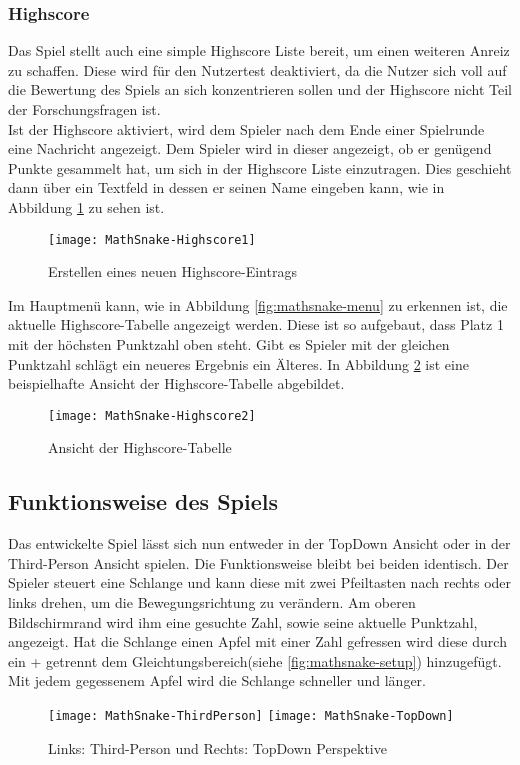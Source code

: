 \subsubsection{Highscore}
Das Spiel stellt auch eine simple Highscore Liste bereit, um einen weiteren Anreiz zu schaffen. Diese wird für den Nutzertest deaktiviert, da die Nutzer sich voll auf die Bewertung des Spiels an sich konzentrieren sollen und der Highscore nicht Teil der Forschungsfragen ist.\\
Ist der Highscore aktiviert, wird dem Spieler nach dem Ende einer Spielrunde eine Nachricht angezeigt. Dem Spieler wird in dieser angezeigt, ob er genügend Punkte gesammelt hat, um sich in der Highscore Liste einzutragen. Dies geschieht dann über ein Textfeld in dessen er seinen Name eingeben kann, wie in Abbildung \ref{fig:mathsnake-newHighscore} zu sehen ist.
\begin{figure}[htb]
	\centering
	\texttt{[image: MathSnake-Highscore1]}
	\caption{Erstellen eines neuen Highscore-Eintrags\label{fig:mathsnake-newHighscore}}
\end{figure}
Im Hauptmenü kann, wie in Abbildung \ref{fig:mathsnake-menu} zu erkennen ist, die aktuelle Highscore-Tabelle angezeigt werden. Diese ist so aufgebaut, dass Platz 1 mit der höchsten Punktzahl oben steht. Gibt es Spieler mit der gleichen Punktzahl schlägt ein neueres Ergebnis ein Älteres. In Abbildung \ref{fig:mathsnake-HighscoreTable} ist eine beispielhafte Ansicht der Highscore-Tabelle abgebildet.
\begin{figure}[htb]
	\centering
	\texttt{[image: MathSnake-Highscore2]}
	\caption{Ansicht der Highscore-Tabelle\label{fig:mathsnake-HighscoreTable}}
\end{figure}
\subsection{Funktionsweise des Spiels}
Das entwickelte Spiel lässt sich nun entweder in der TopDown Ansicht oder in der Third-Person Ansicht spielen. Die Funktionsweise bleibt bei beiden identisch. Der Spieler steuert eine Schlange und kann diese mit zwei Pfeiltasten nach rechts oder links drehen, um die Bewegungsrichtung zu verändern. Am oberen Bildschirmrand wird ihm eine gesuchte Zahl, sowie seine aktuelle Punktzahl, angezeigt. Hat die Schlange einen Apfel mit einer Zahl gefressen wird diese durch ein + getrennt dem Gleichtungsbereich(siehe \ref{fig:mathsnake-setup}) hinzugefügt. Mit jedem gegessenem Apfel wird die Schlange schneller und länger.
\begin{figure}[htb]
	\centering
	\texttt{[image: MathSnake-ThirdPerson]}
	\texttt{[image: MathSnake-TopDown]}
	\caption{Links: Third-Person und Rechts: TopDown Perspektive\label{fig:mathsnake-perspektives}}
\end{figure}
